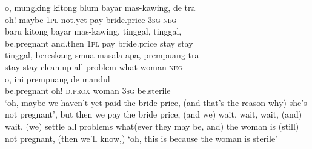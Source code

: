 \ea
\gll   o,    {mungking}    {kitong}    {blum}    {bayar}    {mas-kawing,}   de    {tra}\\
  oh!    {maybe}    {\textsc{1pl}}    {not.yet}    {pay}    {bride.price}   \textsc{3sg}    {\textsc{neg}}\\
    {baru}    {kitong}    {bayar}    {mas-kawing,}    {tinggal,}    {tinggal,}\\
   {be.pregnant}    {and.then}    {\textsc{1pl}}    {pay}    {bride.price}    {stay}    {stay}\\
    {tinggal,}    {bereskang}    {smua}    {masala}    {apa,}    {prempuang}   tra\\
   {stay}    {stay}    {clean.up}    {all}    {problem}    {what}    {woman}   \textsc{neg}\\
    {o,}    {ini}    {prempuang}    {de}    {mandul}\\
   {be.pregnant}    {oh!}    {\textsc{d.prox}}    {woman}    {\textsc{3sg}}    {be.sterile}\\
\glt
‘oh, maybe we haven’t yet paid the bride price, (and that’s the reason why) she’s not pregnant’, but then we pay the bride price, (and we) wait, wait, wait, (and) wait, (we) settle all problems what(ever they may be, and) the woman is (still) not pregnant, (then we’ll know,) ‘oh, this is because the woman is sterile’
\z

